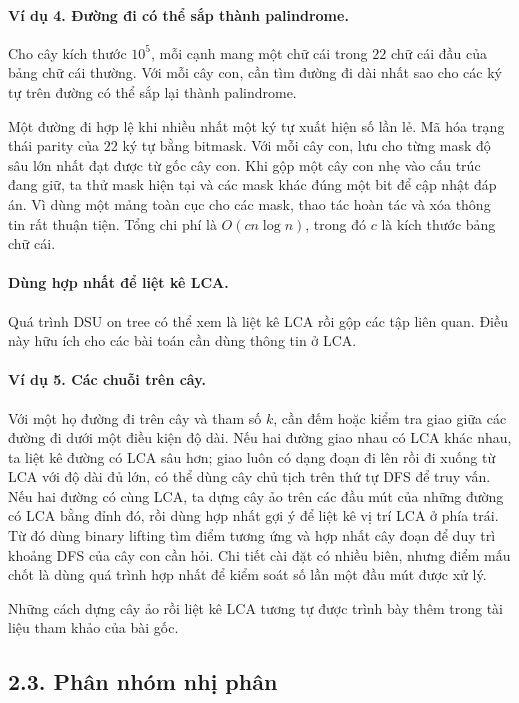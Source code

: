 \documentclass[11pt]{article}
\begin{document}
\paragraph{Ví dụ 4. Đường đi có thể sắp thành palindrome.}
Cho cây kích thước \(10^5\), mỗi cạnh mang một chữ cái trong \(22\) chữ cái đầu
của bảng chữ cái thường. Với mỗi cây con, cần tìm đường đi dài nhất sao cho các
ký tự trên đường có thể sắp lại thành palindrome.

Một đường đi hợp lệ khi nhiều nhất một ký tự xuất hiện số lần lẻ. Mã hóa trạng
thái parity của \(22\) ký tự bằng bitmask. Với mỗi cây con, lưu cho từng mask
độ sâu lớn nhất đạt được từ gốc cây con. Khi gộp một cây con nhẹ vào cấu trúc
đang giữ, ta thử mask hiện tại và các mask khác đúng một bit để cập nhật đáp
án. Vì dùng một mảng toàn cục cho các mask, thao tác hoàn tác và xóa thông tin
rất thuận tiện. Tổng chi phí là \(O(cn\log n)\), trong đó \(c\) là kích thước
bảng chữ cái.

\paragraph{Dùng hợp nhất để liệt kê LCA.}
Quá trình DSU on tree có thể xem là liệt kê LCA rồi gộp các tập liên quan. Điều
này hữu ích cho các bài toán cần dùng thông tin ở LCA.

\paragraph{Ví dụ 5. Các chuỗi trên cây.}
Với một họ đường đi trên cây và tham số \(k\), cần đếm hoặc kiểm tra giao giữa
các đường đi dưới một điều kiện độ dài. Nếu hai đường giao nhau có LCA khác
nhau, ta liệt kê đường có LCA sâu hơn; giao luôn có dạng đoạn đi lên rồi đi
xuống từ LCA với độ dài đủ lớn, có thể dùng cây chủ tịch trên thứ tự DFS để
truy vấn. Nếu hai đường có cùng LCA, ta dựng cây ảo trên các đầu mút của những
đường có LCA bằng đỉnh đó, rồi dùng hợp nhất gợi ý để liệt kê vị trí LCA ở phía
trái. Từ đó dùng binary lifting tìm điểm tương ứng và hợp nhất cây đoạn để duy
trì khoảng DFS của cây con cần hỏi. Chi tiết cài đặt có nhiều biên, nhưng điểm
mấu chốt là dùng quá trình hợp nhất để kiểm soát số lần một đầu mút được xử lý.

Những cách dựng cây ảo rồi liệt kê LCA tương tự được trình bày thêm trong tài
liệu tham khảo của bài gốc.

\subsection*{2.3. Phân nhóm nhị phân}
\end{document}
